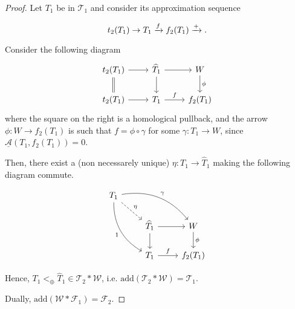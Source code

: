 \begin{proof}
  Let $T_1$ be in $\mathcal{T}_1$ and consider its approximation sequence   

  \begin{equation}
    t_2(T_1)\to T_1\xrightarrow{f} f_2(T_1)\xrightarrow{+}.
  \end{equation}

  Consider the following diagram
  \begin{equation}
    \begin{tikzcd}
      t_2(T_1)\arrow{r}\arrow[equal]{d} &
        \widehat{T}_1\arrow{r}\arrow{d} &
          W\arrow{d}{\phi}\\
      t_2(T_1)\arrow{r}&
        T_1\arrow{r}{f}&
          f_2(T_1)
    \end{tikzcd}
  \end{equation}
  where the square on the right is a homological pullback, and the arrow $\phi:W\to f_2(T_1)$ is such that $f=\phi\circ \gamma$ for some $\gamma:T_1\to W$, since $\underline{\mathcal{A}}(T_1,f_2(T_1))=0$.

  Then, there exist a (non necessarely unique) $\eta:T_1\to \widehat{T}_1$ making the following diagram commute.

  \begin{equation}
    \begin{tikzcd}
      T_1\arrow[bend right]{ddr}[']{1}\arrow[dashed]{dr}{\eta}\arrow[bend left]{rrd}{\gamma}&&\\
      &
        \widehat{T}_1\arrow{r}\arrow{d}&
          W\arrow{d}{\phi}\\
      &
        T_1\arrow{r}{f}&
          f_2(T_1)
    \end{tikzcd}
  \end{equation}

  Hence, $T_1 <_\oplus \widehat{T}_1\in \mathcal{T}_2  \ast \mathcal{W}$, i.e. $\mathrm{add}(\mathcal{T}_2\ast \mathcal{W}) = \mathcal{T}_1$.

  Dually, $\mathrm{add}(\mathcal{W}\ast\mathcal{F}_1) = \mathcal{F}_2$.
\end{proof}
